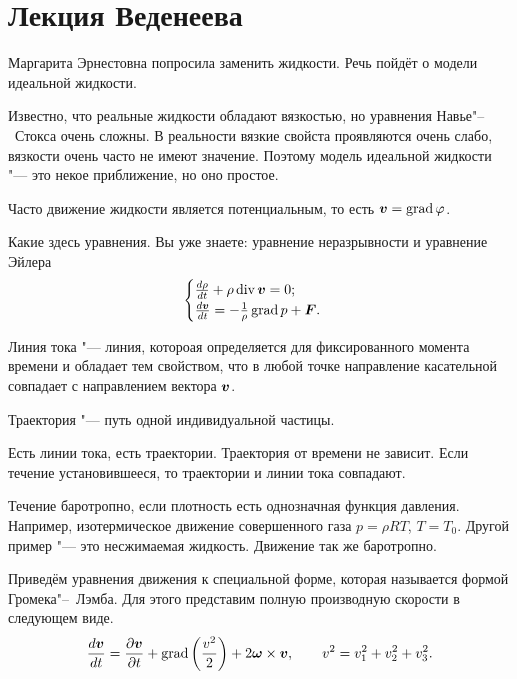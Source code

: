 \section{Лекция Веденеева}

Маргарита Эрнестовна попросила заменить жидкости. Речь пойдёт о модели идеальной жидкости.

Известно, что реальные жидкости обладают вязкостью, но уравнения Навье"--~Стокса очень сложны. В реальности вязкие свойста проявляются очень слабо, вязкости очень часто не имеют значение. Поэтому модель идеальной жидкости "--- это некое приближение, но оно простое.

Часто движение жидкости является потенциальным, то есть $\boldsymbol{v} = \operatorname{grad} \varphi$.

Какие здесь уравнения. Вы уже знаете: уравнение неразрывности и уравнение Эйлера
\begin{equation}\label{eq1}
  \begin{cases}
\frac{d\rho}{d t} +\rho\operatorname{div}\boldsymbol{v} = 0;\\
\frac{d\boldsymbol{v}}{dt} = -\frac1\rho\operatorname{grad} p+\boldsymbol{F}.
\end{cases}
\end{equation}

\begin{Def}
  Линия тока "--- линия, котороая определяется для фиксированного момента времени и обладает тем свойством, что в любой точке направление касательной совпадает с направлением вектора $\boldsymbol{v}$.
\end{Def}
\begin{Def}
Траектория "--- путь одной индивидуальной частицы.
\end{Def}

Есть линии тока, есть траектории. Траектория от времени не зависит. Если течение установившееся, то траектории и линии тока совпадают.

Течение баротропно, если плотность есть однозначная функция давления. Например, изотермическое движение совершенного газа $p=\rho R T$, $T=T_0$. Другой пример "--- это несжимаемая жидкость. Движение так же баротропно.

Приведём уравнения движения к специальной форме, которая называется формой Громека"--~Лэмба. Для этого представим полную производную скорости в следующем виде.
\begin{equation}
\label{eq2}
\frac{d\boldsymbol{v}}{d t} = \frac{\partial \boldsymbol{v}}{\partial t}+\operatorname{grad}\left(\frac{ v^2}2\right) + 2\boldsymbol{\omega}\times \boldsymbol{v},\qquad v^2 = v_1^2+v_2^2+v_3^2.
\end{equation}

